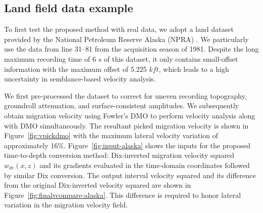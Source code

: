 


\subsection{Land field data example}

To first test the proposed method with real data, we adopt a land dataset provided by the National Petroleum Reserve Alaska (NPRA) \cite[]{dataalaska}. We particularly use the data from line 31--81 from the acquisition season of 1981. Despite the long maximum recording time of 6 $s$ of this dataset, it only contains small-offset information with the maximum offset of 5.225 $kft$, which leads to a high uncertainty in semblance-based velocity analysis.

We first pre-processed the dataset to correct for uneven recording topography, groundroll attenuation, and surface-consistent amplitudes. We subsequently obtain migration velocity using Fowler's DMO \cite[]{fowlerdmo} to perform velocity analysis along with DMO simultaneously. The resultant picked migration velocity is shown in Figure~\ref{fig:vpickdmo} with the maximum lateral velocity variation of approximately 16$\%$. Figure~\ref{fig:input-alaska} shows the inputs for the proposed time-to-depth conversion method: Dix-inverted migration velocity squared $w_{dr}(x,z)$ and its gradients evaluated in the time-domain coordinates followed by similar Dix conversion. The output interval velocity squared and its difference from the original Dix-inverted velocity squared are shown in Figure~\ref{fig:finalvcompare-alaska}. This difference is required to honor lateral variation in the migration velocity field.

